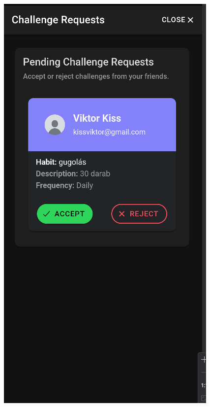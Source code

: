 \documentclass[12pt]{report}
\begin{document}
\begin{figure}[H]
\begin{minipage}[b]{0.25\textwidth}
        \includegraphics[width=\linewidth]{src/challenge4.png}
    \end{minipage}
    \hfill
    \begin{minipage}[b]{0.25\textwidth}

\end{minipage}
\end{figure}
\end{document}
